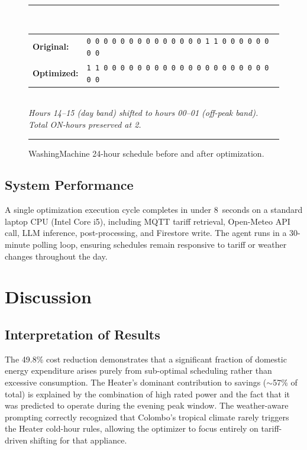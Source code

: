 \documentclass[conference]{IEEEtran}
\begin{document}
\begin{figure}[h]
  \centering
  \rule{\columnwidth}{0.4pt}\\[2pt]
  \small
  \begin{tabular}{lp{}}
    \textbf{Original:}  & \texttt{0 0 0 0 0 0 0 0 0 0 0 0 0 0 1 1 0 0 0 0 0 0 0 0} \\
    \textbf{Optimized:} & \texttt{1 1 0 0 0 0 0 0 0 0 0 0 0 0 0 0 0 0 0 0 0 0 0 0} \\
  \end{tabular}\\[2pt]
  \small\textit{Hours 14–15 (day band) shifted to hours 00–01 (off-peak band).
  Total ON-hours preserved at 2.}\\[2pt]
  \rule{\columnwidth}{0.4pt}
  \caption{WashingMachine 24-hour schedule before and after optimization.}
  \label{fig:schedule}
\end{figure}

\subsection{System Performance}

A single optimization execution cycle completes in
under 8~seconds on a standard laptop CPU (Intel Core i5),
including MQTT tariff retrieval, Open-Meteo API call, LLM
inference, post-processing, and Firestore write.
The agent runs in a 30-minute polling loop, ensuring schedules
remain responsive to tariff or weather changes throughout the day.

\section{Discussion}
\label{sec:disc}

\subsection{Interpretation of Results}

The 49.8\% cost reduction demonstrates that a significant
fraction of domestic energy expenditure arises purely from
sub-optimal scheduling rather than excessive consumption.
The Heater's dominant contribution to savings ($\sim$57\% of
total) is explained by the combination of high rated power
and the fact that it was predicted to operate during the
evening peak window.
The weather-aware prompting correctly recognized that Colombo's
tropical climate rarely triggers the Heater cold-hour rules,
allowing the optimizer to focus entirely on tariff-driven
shifting for that appliance.
\end{document}
